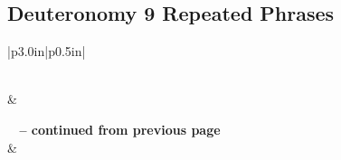 \subsection{Deuteronomy 9 Repeated Phrases}


\normalsize
 
\begin{center}
\begin{longtable}{|p{3.0in}|p{0.5in}|}
\caption[Deuteronomy 9 Repeated Phrases]{Deuteronomy 9 Repeated Phrases}\label{table:Repeated Phrases Deuteronomy 9} \\
\hline {} &  \\ \hline 
\endfirsthead
 
{{\bfseries \tablename\ \thetable{} -- continued from previous page}} \\  
\hline {} &  \\ \hline 
\endhead
 

\end{longtable}
\end{center}
